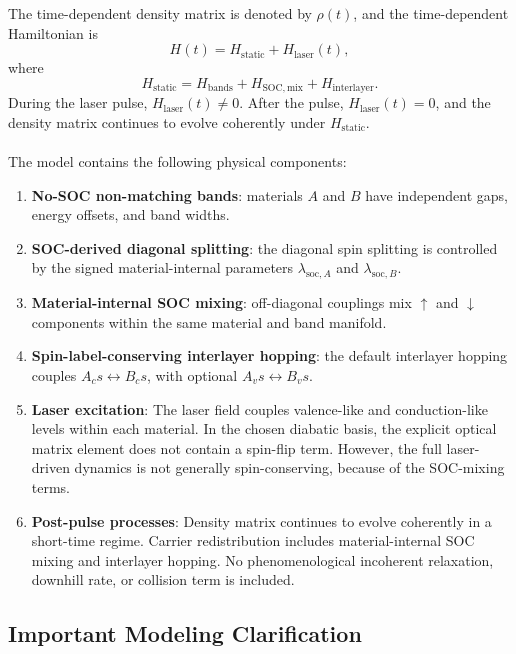 \documentclass[11pt,a4paper]{article}
\begin{document}
The time-dependent density matrix is denoted by $\rho(t)$, and the time-dependent Hamiltonian is
\begin{equation}
H(t) = H_{\mathrm{static}} + H_{\mathrm{laser}}(t),
\end{equation}
where
\begin{equation}
H_{\mathrm{static}}
=
H_{\mathrm{bands}}
+
H_{\mathrm{SOC,mix}}
+
H_{\mathrm{interlayer}}.
\end{equation}
During the laser pulse, \(H_{\mathrm{laser}}(t)\neq 0\).  
After the pulse, \(H_{\mathrm{laser}}(t)=0\), and the density matrix continues to evolve 
coherently under \(H_{\mathrm{static}}\).
\\
\\
The model contains the following physical components:
\begin{enumerate}
  \item \textbf{No-SOC non-matching bands}: materials $A$ and $B$ have independent gaps, energy offsets, and band widths.
  \item \textbf{SOC-derived diagonal splitting}: the diagonal spin splitting is controlled by the signed material-internal parameters \(\lambda_{\mathrm{soc},A}\) and \(\lambda_{\mathrm{soc},B}\).
  \item \textbf{Material-internal SOC mixing}: off-diagonal couplings mix $\uparrow$ and $\downarrow$ components within the same material and band manifold.
  \item \textbf{Spin-label-conserving interlayer hopping}: the default interlayer hopping couples \(A_c s\leftrightarrow B_c s\), with optional \(A_v s\leftrightarrow B_v s\).
  \item \textbf{Laser excitation}: The laser field couples valence-like and conduction-like levels within each material.  In the chosen diabatic basis, the explicit optical matrix element does not contain a spin-flip term.  However, the full laser-driven dynamics is not generally spin-conserving, because of the SOC-mixing terms.
  \item \textbf{Post-pulse processes}: Density matrix continues to evolve coherently in a short-time regime. Carrier redistribution includes material-internal SOC mixing and interlayer hopping. No phenomenological incoherent relaxation, downhill rate, or collision term is included.
\end{enumerate}

\subsection*{Important Modeling Clarification}
\end{document}
